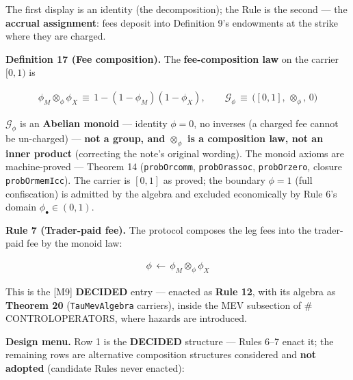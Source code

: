 \documentclass[11pt]{article}
\renewcommand{\_}{\textunderscore\allowbreak}
\begin{document}
The first display is an identity (the decomposition); the Rule is the second --- the \textbf{accrual assignment}: fees deposit into Definition 9's endowments at the strike where they are charged.

\textbf{Definition 17 (Fee composition).} The \textbf{fee-composition law} on the carrier \([0,1)\) is

\[
    \begin{aligned}
        \phi_M \otimes_{\phi} \phi_X \, \equiv \, 1 - (1-\phi_M)(1-\phi_X), \qquad \mathcal{G}_{\phi} \, \equiv \, \big([0,1],\, \otimes_{\phi},\, 0\big)
    \end{aligned}
\]

\(\mathcal{G}_{\phi}\) is an \textbf{Abelian monoid} --- identity \(\phi = 0\), no inverses (a charged fee cannot be un-charged) --- \textbf{not a group, and \(\otimes_{\phi}\) is a composition law, not an inner product} (correcting the note's original wording). The monoid axioms are machine-proved --- Theorem 14 (\texttt{probOr\_comm}, \texttt{probOr\_assoc}, \texttt{probOr\_zero}, closure \texttt{probOr\_mem\_Icc}). The carrier is \([0,1]\) as proved; the boundary \(\phi = 1\) (full confiscation) is admitted by the algebra and excluded economically by Rule 6's domain \(\phi_{\bullet} \in (0,1)\).

\textbf{Rule 7 (Trader-paid fee).} The protocol composes the leg fees into the trader-paid fee by the monoid law:

\[
    \begin{aligned}
        \phi \, \leftarrow \, \phi_M \otimes_{\phi} \phi_X
    \end{aligned}
\]

This is the {[}M9{]} \textbf{DECIDED} entry --- enacted as \textbf{Rule 12}, with its algebra as \textbf{Theorem 20} (\texttt{TauMevAlgebra} carriers), inside the MEV subsection of \# CONTROL\_OPERATORS, where hazards are introduced.

\textbf{Design menu.} Row 1 is the \textbf{DECIDED} structure --- Rules 6--7 enact it; the remaining rows are alternative composition structures considered and \textbf{not adopted} (candidate Rules never enacted):
\end{document}
